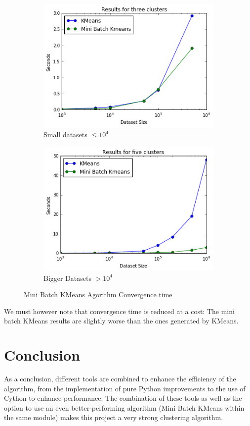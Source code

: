 \documentclass[11pt]{article}
\begin{document}
\begin{figure}[t!]
	\centering 
	\begin{subfigure}{0.48\textwidth}
		\includegraphics[width=\textwidth]{Figures/minibatch.png}
		\caption{Small datasets $\leq 10^4$}
		\label{minibatch}
	\end{subfigure}
	\quad
	\begin{subfigure}{0.48\textwidth}
		\includegraphics[width=\textwidth]{Figures/minibatch2.png}
		\caption{Bigger Datasets $> 10^4$}
			\label{minibatch2}
	\end{subfigure} 
	\caption{Mini Batch KMeans Agorithm Convergence time}
\end{figure}

\noindent We must however note that convergence time is reduced at a cost: The mini batch KMeans results are slightly worse than the ones generated by KMeans.


\section*{Conclusion}
As a conclusion, different tools are combined to enhance the efficiency of the algorithm, from the implementation of pure Python improvements to the use of Cython to enhance performance. The combination of these tools as well as the option to use an even better-performing algorithm (Mini Batch KMeans within the same module) makes this project a very strong clustering algorithm. \\
\end{document}
